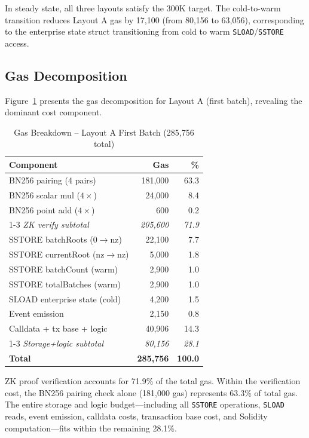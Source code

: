 In steady state, all three layouts satisfy the 300K target. The cold-to-warm transition
reduces Layout A gas by 17,100 (from 80,156 to 63,056), corresponding to the enterprise
state struct transitioning from cold to warm \texttt{SLOAD}/\texttt{SSTORE} access.

\subsection{Gas Decomposition}

Figure~\ref{fig:gas-breakdown} presents the gas decomposition for Layout A (first batch),
revealing the dominant cost component.

\begin{table}[htbp]
\centering
\caption{Gas Breakdown -- Layout A First Batch (285,756 total)}
\label{fig:gas-breakdown}
\small
\begin{tabular}{@{}lrr@{}}
\toprule
\textbf{Component} & \textbf{Gas} & \textbf{\%} \\
\midrule
BN256 pairing (4 pairs)        & 181,000 & 63.3 \\
BN256 scalar mul ($4\times$)   & 24,000  & 8.4 \\
BN256 point add ($4\times$)    & 600     & 0.2 \\
\cmidrule{1-3}
\textit{ZK verify subtotal}    & \textit{205,600} & \textit{71.9} \\
\midrule
SSTORE batchRoots (0$\to$nz)   & 22,100  & 7.7 \\
SSTORE currentRoot (nz$\to$nz) & 5,000   & 1.8 \\
SSTORE batchCount (warm)       & 2,900   & 1.0 \\
SSTORE totalBatches (warm)     & 2,900   & 1.0 \\
SLOAD enterprise state (cold)  & 4,200   & 1.5 \\
Event emission                 & 2,150   & 0.8 \\
Calldata + tx base + logic     & 40,906  & 14.3 \\
\cmidrule{1-3}
\textit{Storage+logic subtotal} & \textit{80,156}  & \textit{28.1} \\
\midrule
\textbf{Total}                 & \textbf{285,756} & \textbf{100.0} \\
\bottomrule
\end{tabular}
\end{table}

ZK proof verification accounts for 71.9\% of the total gas. Within the verification cost,
the BN256 pairing check alone (181,000 gas) represents 63.3\% of total gas. The entire
storage and logic budget---including all \texttt{SSTORE} operations, \texttt{SLOAD} reads,
event emission, calldata costs, transaction base cost, and Solidity computation---fits
within the remaining 28.1\%.

